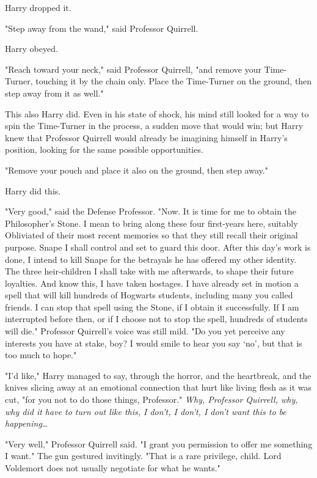 Harry dropped it.

"Step away from the wand," said Professor Quirrell.

Harry obeyed.

"Reach toward your neck," said Professor Quirrell, "and remove your 
Time-Turner, touching it by the chain only. Place the Time-Turner on the 
ground, then step away from it as well."

This also Harry did. Even in his state of shock, his mind still looked for a 
way to spin the Time-Turner in the process, a sudden move that would win; but 
Harry knew that Professor Quirrell would already be imagining himself in 
Harry's position, looking for the same possible opportunities.

"Remove your pouch and place it also on the ground, then step away."

Harry did this.

"Very good," said the Defense Professor. "Now. It is time for me to obtain the 
Philosopher's Stone. I mean to bring along these four first-years here, 
suitably Obliviated of their most recent memories so that they still recall 
their original purpose. Snape I shall control and set to guard this door. After 
this day's work is done, I intend to kill Snape for the betrayals he has 
offered my other identity. The three heir-children I shall take with me 
afterwards, to shape their future loyalties. And know this, I have taken 
hostages. I have already set in motion a spell that will kill hundreds of 
Hogwarts students, including many you called friends. I can stop that spell 
using the Stone, if I obtain it successfully. If I am interrupted before then, 
or if I choose not to stop the spell, hundreds of students will die." Professor 
Quirrell's voice was still mild. "Do you yet perceive any interests you have at 
stake, boy? I would smile to hear you say `no', but that is too much to hope."

"I'd like," Harry managed to say, through the horror, and the heartbreak, and 
the knives slicing away at an emotional connection that hurt like living flesh 
as it was cut, "for you not to do those things, Professor." \emph{Why, 
Professor Quirrell, why, why did it have to turn out like this, I don't, I 
don't, I don't want this to be happening{\ldots}}

"Very well," Professor Quirrell said. "I grant you permission to offer me 
something I want." The gun gestured invitingly. "That is a rare privilege, 
child. Lord Voldemort does not usually negotiate for what he wants."

